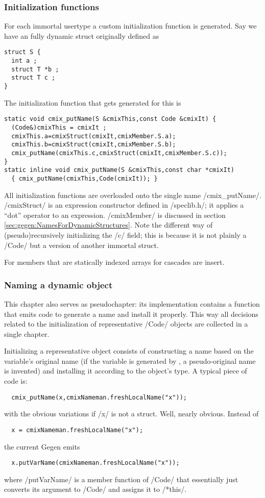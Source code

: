 \begin{docpart}
\subsubsection{Initialization functions}
For each immortal usertype a custom initialization function is
generated. Say we have an fully dynamic struct originally defined as
\begin{verbatim}
struct S {
  int a ;
  struct T *b ;
  struct T c ;
}
\end{verbatim}
The initialization function that gets generated for this is
\begin{verbatim}
static void cmix_putName(S &cmixThis,const Code &cmixIt) {
  (Code&)cmixThis = cmixIt ;
  cmixThis.a=cmixStruct(cmixIt,cmixMember.S.a);
  cmixThis.b=cmixStruct(cmixIt,cmixMember.S.b);
  cmix_putName(cmixThis.c,cmixStruct(cmixIt,cmixMember.S.c));
}
static inline void cmix_putName(S &cmixThis,const char *cmixIt)
  { cmix_putName(cmixThis,Code(cmixIt)); }
\end{verbatim}

All initialization functions are overloaded onto the single
name /cmix_putName/. /cmixStruct/ is an expression constructor
defined in /speclib.h/; it applies a ``dot'' operator to an
expression. /cmixMember/ is discussed in section
\ref{sec:gegen:NamesForDynamicStructures}. Note the different way
of (pseudo)recursively initializing the /c/ field; this is because it
is not plainly a /Code/ but a \Pgen{} version of another immortal
struct.

For members that are statically indexed arrays for cascades are insert.

\subsubsection{Naming a dynamic object}
This chapter also serves as pseudochapter: its implementation contains
a function that emits \Pgen{} code to generate a name and install it
properly. This way all decisions related to the initialization of
representative /Code/ objects are collected in a single chapter.

Initializing a representative object consists of constructing a name
based on the variable's original name (if the variable is generated by
\cmix, a pseudo-original name is invented) and installing it according
to the object's type. A typical piece of code is:
\begin{verbatim}
  cmix_putName(x,cmixNameman.freshLocalName("x"));
\end{verbatim}
with the obvious variations if /x/ is not a struct. Well, nearly
obvious. Instead of
\begin{verbatim}
  x = cmixNameman.freshLocalName("x");
\end{verbatim}
the current Gegen emits
\begin{verbatim}
  x.putVarName(cmixNameman.freshLocalName("x"));
\end{verbatim}
where /putVarName/ is a member function of /Code/ that essentially just
converts its argument to /Code/ and assigns it to /*this/.


\end{docpart}
